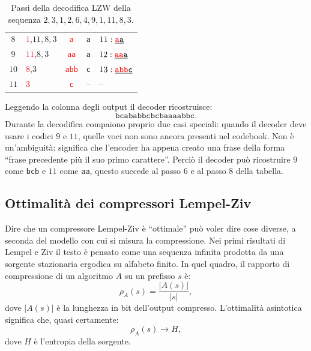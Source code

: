 \documentclass{article}
\theoremstyle{definition}
\numberwithin{equation}{section}
\begin{document}
\begin{table}[H]
\begin{tabular}{c|l|c|c|l}
        $8$            & \textcolor{red}{$1$},$11,8,3$               & \textcolor{red}{\texttt{a}}   & \texttt{a}                & $11:\uline{\textcolor{red}{\texttt{a}}\texttt{a}}$   \\
        $9$            & \textcolor{red}{$11$},$8,3$                 & \textcolor{red}{\texttt{aa}}  & \texttt{a}                & $12:\uline{\textcolor{red}{\texttt{aa}}\texttt{a}}$  \\
        $10$           & \textcolor{red}{$8$},$3$                    & \textcolor{red}{\texttt{abb}} & \texttt{c}                & $13:\uline{\textcolor{red}{\texttt{abb}}\texttt{c}}$ \\
        $11$           & \textcolor{red}{$3$}                        & \textcolor{red}{\texttt{c}}   & --                        & --
    \end{tabular}
    \caption{Passi della decodifica LZW della sequenza $2,3,1,2,6,4,9,1,11,8,3$.}
    \label{tab:lzw_decoding_bcababb}
\end{table}

Leggendo la colonna degli output il decoder ricostruisce:
\[
    \texttt{bcababbcbcbaaaabbc}.
\]
Durante la decodifica compaiono proprio due casi speciali: quando il decoder deve usare i codici $9$ e $11$, quelle voci non sono ancora presenti nel codebook. Non è un'ambiguità: significa che l'encoder ha appena creato una frase della forma ``frase precedente più il suo primo carattere''. Perciò il decoder può ricostruire $9$ come \texttt{bcb} e $11$ come \texttt{aa}, questo succede al passo 6 e al passo 8 della tabella.

\subsection{Ottimalità dei compressori Lempel-Ziv}
Dire che un compressore Lempel-Ziv è ``ottimale'' può voler dire cose diverse, a seconda del modello con cui si misura la compressione. Nei primi risultati di Lempel e Ziv il testo è pensato come una sequenza infinita prodotta da una sorgente stazionaria ergodica su alfabeto finito. In quel quadro, il rapporto di compressione di un algoritmo $A$ su un prefisso $s$ è:
\begin{equation}\label{eq:lz_compression_ratio}
    \rho_A(s)
    =
    \frac{|A(s)|}{|s|},
\end{equation}
dove $|A(s)|$ è la lunghezza in bit dell'output compresso. L'ottimalità asintotica significa che, quasi certamente:
\[
    \rho_A(s)
    \longrightarrow
    H,
\]
dove $H$ è l'entropia della sorgente.
\end{document}
